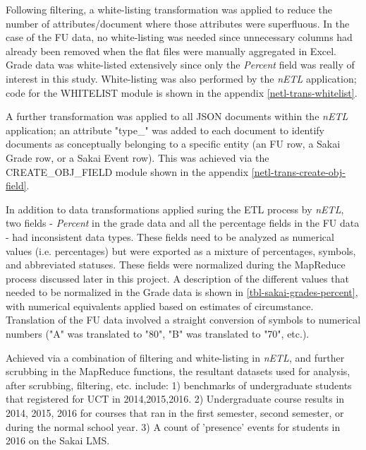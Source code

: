 Following filtering, a white-listing transformation was applied to reduce the number of attributes/document where those attributes were superfluous. In the case of the FU data, no white-listing was needed since unnecessary columns had already been removed when the flat files were manually aggregated in Excel. Grade data was white-listed extensively since only the \textit{Percent} field was really of interest in this study. White-listing was also performed by the \textit{nETL} application; code for the WHITELIST module is shown in the appendix \ref{netl-trans-whitelist}.

A further transformation was applied to all JSON documents within the \textit{nETL} application; an attribute "type\_" was added to each document to identify documents as conceptually belonging to a specific entity (an FU row, a Sakai Grade row, or a Sakai Event row). This was achieved via the CREATE\_OBJ\_FIELD module shown in the appendix \ref{netl-trans-create-obj-field}.

In addition to data transformations applied suring the ETL process by \textit{nETL}, two fields - \textit{Percent} in the grade data and all the percentage fields in the FU data - had inconsistent data types. These fields need to be analyzed as numerical values (i.e. percentages) but were exported as a mixture of percentages, symbols, and abbreviated statuses. These fields were normalized during the MapReduce process discussed later in this project. A description of the different values that needed to be normalized in the Grade data is shown in \ref{tbl-sakai-grades-percent}, with numerical equivalents applied based on estimates of circumstance. Translation of the FU data involved a straight conversion of symbols to numerical numbers ("A" was translated to "80", "B" was translated to "70", etc.).

Achieved via a combination of filtering and white-listing in \textit{nETL}, and further scrubbing in the MapReduce functions, the resultant datasets used for analysis, after scrubbing, filtering, etc. include: 1) benchmarks of undergraduate students that registered for UCT in 2014,2015,2016. 2) Undergraduate course results in 2014, 2015, 2016 for courses that ran in the first semester, second semester, or during the normal school year. 3) A count of 'presence' events for students in 2016 on the Sakai LMS.